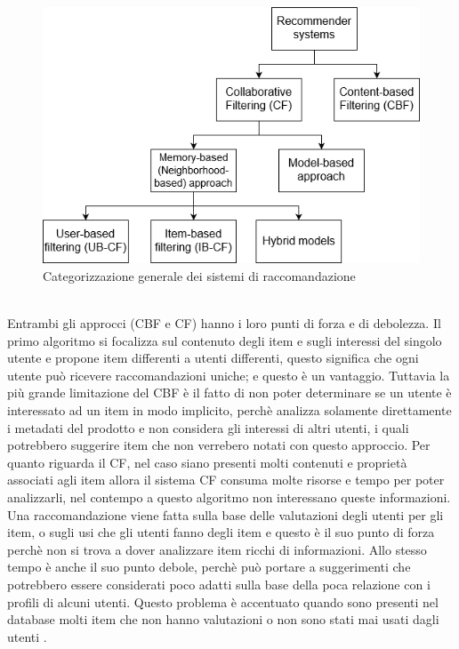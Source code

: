 \begin{figure}[ht!]
	\centering
	\includegraphics[scale=0.5]{images/recommender_systems.png}
	\caption{Categorizzazione generale dei sistemi di raccomandazione}
	\label{fig:recommender_systems}
\end{figure}
\ \\
Entrambi gli approcci (CBF e CF) hanno i loro punti di forza e di debolezza. Il primo algoritmo si focalizza sul contenuto degli item e
sugli interessi del singolo utente e propone item differenti a utenti differenti, questo significa che ogni utente può ricevere 
raccomandazioni uniche; e questo è un vantaggio. 
Tuttavia la più grande limitazione del CBF è il fatto di non poter determinare se un utente è interessato ad un item in modo implicito,
perchè analizza solamente direttamente i metadati del prodotto e non considera gli interessi di altri utenti, i quali potrebbero 
suggerire item che non verrebero notati con questo approccio.
Per quanto riguarda il CF, nel caso siano presenti molti contenuti e proprietà associati agli item allora il sistema CF consuma molte 
risorse e tempo per poter analizzarli, nel contempo a questo algoritmo non interessano queste informazioni. Una raccomandazione 
viene fatta sulla base delle valutazioni degli utenti per gli item, o sugli usi che gli utenti fanno degli item e questo è il suo punto 
di forza perchè non si trova a dover analizzare item ricchi di informazioni. Allo stesso tempo è anche il suo punto debole, perchè può
portare a suggerimenti che potrebbero essere considerati poco adatti sulla base della poca relazione con i profili di alcuni utenti. 
Questo problema è accentuato quando sono presenti nel database molti item che non hanno valutazioni o non sono stati mai usati dagli 
utenti \cite{model-based-approach-for-collaborative-filtering}.

